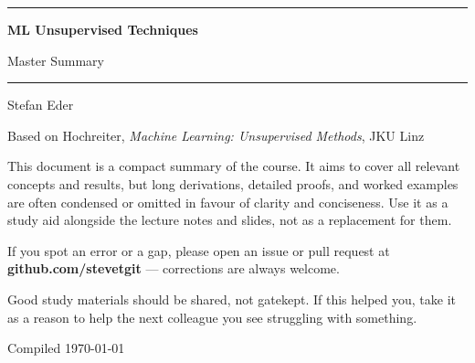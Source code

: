 \documentclass[11pt, oneside]{book}
\newcommand{\coursetitle}{ML Unsupervised Techniques}
\newcommand{\documenttype}{Master Summary}
\newcommand{\authorname}{Stefan Eder}
\newcommand{\basedon}{Based on Hochreiter, \emph{Machine Learning: Unsupervised Methods}, JKU Linz}
\begin{document}
\frontmatter


\thispagestyle{empty}
\vspace*{1.8cm}

\begin{center}
  {\color{accent}\rule{\linewidth}{1.8pt}}
  \vspace{0.65cm}

  {\fontsize{28}{34}\selectfont\bfseries\color{accent}\coursetitle\par}
  \vspace{0.25cm}
  {\large\color{gray!80!black}\documenttype\par}

  \vspace{0.55cm}
  {\color{accent!35}\rule{\linewidth}{0.5pt}}
  \vspace{0.55cm}

  {\large\authorname\par}
  \vspace{0.2cm}
  {\small\color{gray!70}\basedon\par}
\end{center}

\vspace{1.6cm}

\begin{center}
\begin{minipage}{0.84\textwidth}
  \small\color{gray!80!black}
  This document is a compact summary of the course.
  It aims to cover all relevant concepts and results, but long derivations,
  detailed proofs, and worked examples are often condensed or omitted in
  favour of clarity and conciseness.
  Use it as a study aid alongside the lecture notes and slides, not as a
  replacement for them.

  \medskip
  If you spot an error or a gap, please open an issue or pull request at
  \textbf{github.com/stevetgit} --- corrections are always welcome.

  \medskip
  \color{gray!60!black}
  Good study materials should be shared, not gatekept.
  If this helped you, take it as a reason to help the next colleague you see struggling with something.
\end{minipage}
\end{center}

\vfill
{\centering\small\color{gray!65} Compiled \today\par}
\clearpage


\setcounter{tocdepth}{2}
\end{document}
